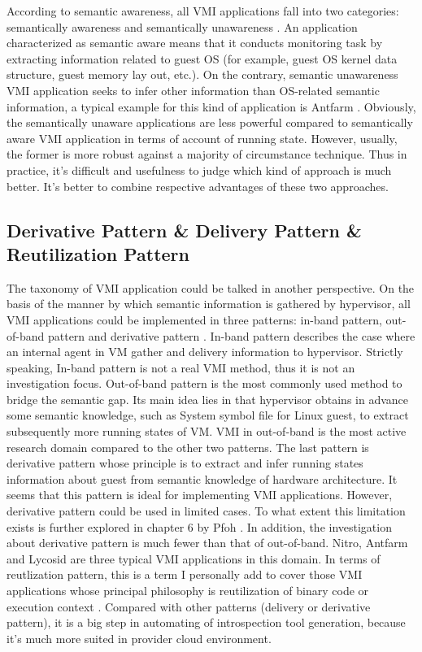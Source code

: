 According to semantic awareness, all VMI applications fall into two categories: semantically awareness and semantically unawareness 
\cite{Reference3}. An application characterized as semantic aware means that it conducts monitoring task by extracting information 
related to guest OS (for example, guest OS kernel data structure, guest memory lay out, etc.). On the contrary, semantic unawareness 
VMI application seeks to infer other information than OS-related semantic information, a typical example for this kind of application 
is Antfarm  \cite{Reference4}. Obviously, the semantically unaware applications are less powerful compared to semantically aware VMI 
application in terms of account of running state. However, usually, the former is more robust against a majority of circumstance 
technique. Thus in practice, it’s difficult and usefulness to judge which kind of approach is much better. It’s better to combine 
respective advantages of these two approaches.

\subsection{Derivative Pattern \& Delivery Pattern \& Reutilization Pattern}

The taxonomy of VMI application could be talked in another perspective. On the basis of the manner by which semantic information is gathered by 
hypervisor, all VMI applications could be implemented in three patterns: in-band pattern, out-of-band pattern and derivative pattern \cite{Reference5}.
In-band pattern describes the case where an internal agent in VM gather and delivery information to hypervisor. Strictly speaking, In-band 
pattern is not a real VMI method, thus it is not an investigation focus. Out-of-band pattern is the most commonly used method to bridge the 
semantic gap. Its main idea lies in that hypervisor obtains in advance some semantic knowledge, such as System symbol file for Linux guest, 
to extract subsequently more running states of VM. VMI in out-of-band is the most active research domain compared to the other two patterns. 
The last pattern is derivative pattern whose principle is to extract and infer running states information about guest from semantic knowledge 
of hardware architecture. It seems that this pattern is ideal for implementing VMI applications. However, derivative pattern could be used in 
limited cases. To what extent this limitation exists is further explored in chapter 6 by Pfoh \cite{Reference7}. In addition, the investigation 
about derivative pattern is much fewer than that of out-of-band. Nitro, Antfarm and Lycosid \cite{Reference4, Reference8, Reference9} are three 
typical VMI applications in this domain. In terms of reutlization pattern, this is a term I personally add to cover those VMI applications
whose principal philosophy is reutilization of binary code or execution context \cite{Reference7, Reference28}. Compared with other 
patterns (delivery or derivative pattern), it is a big step in automating of introspection tool generation, because it's much more suited
in provider cloud environment.

